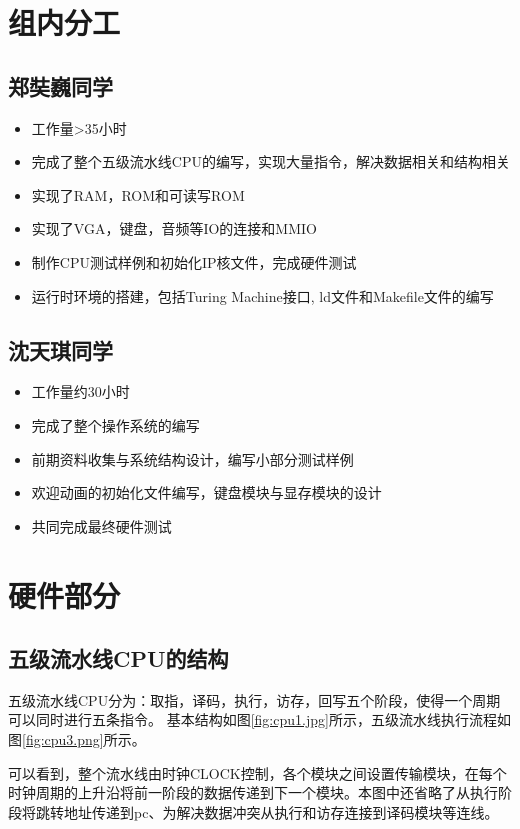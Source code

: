 \chapter{组内分工}
\section{郑奘巍同学}
\begin{itemize}
    \item 工作量>35小时
    \item 完成了整个五级流水线CPU的编写，实现大量指令，解决数据相关和结构相关
    \item 实现了RAM，ROM和可读写ROM
    \item 实现了VGA，键盘，音频等IO的连接和MMIO
    \item 制作CPU测试样例和初始化IP核文件，完成硬件测试
    \item 运行时环境的搭建，包括Turing Machine接口, ld文件和Makefile文件的编写
\end{itemize}
\section{沈天琪同学}
\begin{itemize}
    \item 工作量约30小时
    \item 完成了整个操作系统的编写
    \item 前期资料收集与系统结构设计，编写小部分测试样例
    \item 欢迎动画的初始化文件编写，键盘模块与显存模块的设计
    \item 共同完成最终硬件测试
\end{itemize}


\chapter{硬件部分}
\section{五级流水线CPU的结构}
    五级流水线CPU分为：取指，译码，执行，访存，回写五个阶段，使得一个周期可以同时进行五条指令。
    基本结构如图\ref{fig:cpu1.jpg}所示，五级流水线执行流程如图\ref{fig:cpu3.png}所示。

    可以看到，整个流水线由时钟CLOCK控制，各个模块之间设置传输模块，在每个时钟周期的上升沿将前一阶段的数据传递到下一个模块。本图中还省略了从执行阶段将跳转地址传递到pc、为解决数据冲突从执行和访存连接到译码模块等连线。

